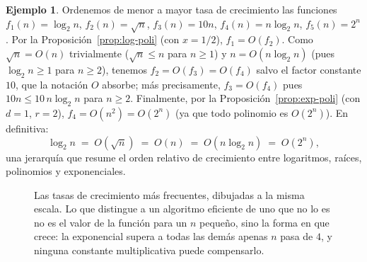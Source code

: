 \documentclass[12pt, spanish, oneside, openany]{book}
\theoremstyle{uprightplain}
\theoremstyle{definition}
\newtheorem{ejemplo}[teorema]{Ejemplo}
\theoremstyle{remark}
\theoremstyle{definition}
\begin{document}
\begin{ejemplo}
\label{ej:jerarquia}
Ordenemos de menor a mayor tasa de crecimiento las funciones $f_1(n)=\log_2 n$, $f_2(n)=\sqrt n$, $f_3(n)=10n$, $f_4(n)=n\log_2 n$, $f_5(n)=2^n$. Por la Proposición~\ref{prop:log-poli} (con $x=1/2$), $f_1=O(f_2)$. Como $\sqrt n = O(n)$ trivialmente ($\sqrt n\le n$ para $n\ge1$) y $n=O(n\log_2 n)$ (pues $\log_2 n\ge 1$ para $n\ge 2$), tenemos $f_2=O(f_3)=O(f_4)$ salvo el factor constante $10$, que la notación $O$ absorbe; más precisamente, $f_3=O(f_4)$ pues $10n\le 10\,n\log_2 n$ para $n\ge 2$. Finalmente, por la Proposición~\ref{prop:exp-poli} (con $d=1$, $r=2$), $f_4=O(n^2)=O(2^n)$ (ya que todo polinomio es $O(2^n)$). En definitiva:
\[
\log_2 n \;=\;O(\sqrt n)\;=\;O(n)\;=\;O(n\log_2 n)\;=\;O(2^n),
\]
una jerarquía que resume el orden relativo de crecimiento entre logaritmos, raíces, polinomios y exponenciales.
\end{ejemplo}
\begin{figure}[H]
\centering
{}
\caption{Las tasas de crecimiento más frecuentes, dibujadas a la misma escala.
Lo que distingue a un algoritmo eficiente de uno que no lo es no es el valor
de la función para un $n$ pequeño, sino la forma en que crece: la exponencial
supera a todas las demás apenas $n$ pasa de $4$, y ninguna constante
multiplicativa puede compensarlo.}
\label{fig:tasas-crecimiento}
\end{figure}
\end{document}
